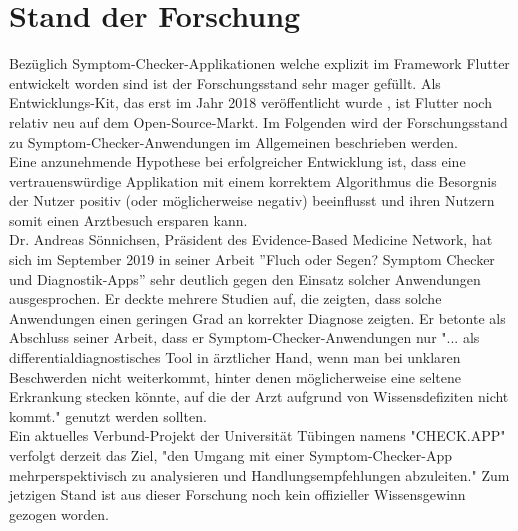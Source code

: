 \section{Stand der Forschung}
Bezüglich Symptom-Checker-Applikationen welche explizit im Framework Flutter entwickelt worden sind ist der Forschungsstand sehr mager gefüllt. Als Entwicklungs-Kit, das erst im Jahr 2018 veröffentlicht wurde \cite{.flutter}, ist Flutter noch relativ neu auf dem Open-Source-Markt. Im Folgenden wird der Forschungsstand zu Symptom-Checker-Anwendungen im Allgemeinen beschrieben werden.\\
Eine anzunehmende Hypothese bei erfolgreicher Entwicklung ist, dass eine vertrauenswürdige Applikation mit einem korrektem Algorithmus die Besorgnis der Nutzer positiv (oder möglicherweise negativ) beeinflusst und ihren Nutzern somit einen Arztbesuch ersparen kann. \\
Dr. Andreas Sönnichsen, Präsident des Evidence-Based Medicine Network, hat sich im September 2019 in seiner Arbeit ''Fluch oder Segen? Symptom Checker und Diagnostik-Apps'' sehr deutlich gegen den Einsatz solcher Anwendungen ausgesprochen. Er deckte mehrere Studien auf, die zeigten, dass solche Anwendungen einen geringen Grad an korrekter Diagnose zeigten.  Er betonte als Abschluss seiner Arbeit, dass er Symptom-Checker-Anwendungen nur "... als differentialdiagnostisches Tool in ärztlicher Hand, wenn man bei unklaren Beschwerden nicht weiterkommt, hinter denen möglicherweise eine seltene Erkrankung stecken könnte, auf die der Arzt aufgrund von Wissensdefiziten nicht kommt." \cite{.ebm} genutzt werden sollten.\\
Ein aktuelles Verbund-Projekt der Universität Tübingen namens "CHECK.APP" verfolgt derzeit das Ziel, "den Umgang mit einer Symptom-Checker-App mehrperspektivisch zu analysieren und Handlungsempfehlungen abzuleiten." \cite{.uni} Zum jetzigen Stand ist aus dieser Forschung noch kein offizieller Wissensgewinn gezogen worden.









